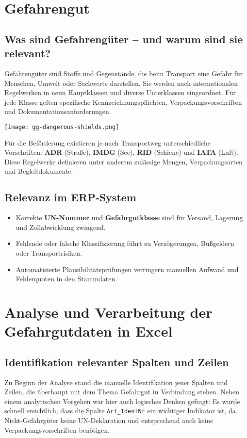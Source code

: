 \section{Gefahrengut}
\subsection{Was sind Gefahrengüter – und warum sind sie relevant?}

Gefahrengüter sind Stoffe und Gegenstände, die beim Transport eine
Gefahr für Menschen, Umwelt oder Sachwerte darstellen. Sie werden nach
internationalen Regelwerken in neun Hauptklassen und diverse Unterklassen
eingeordnet. Für jede Klasse gelten spezifische Kennzeichnungspflichten,
Verpackungsvorschriften und Dokumentationsanforderungen.

\begin{center}
  \texttt{[image: gg-dangerous-shields.png]}
\end{center}

Für die Beförderung existieren je nach Transportweg unterschiedliche Vorschriften:
\textbf{ADR} (Straße), \textbf{IMDG} (See), \textbf{RID} (Schiene) und \textbf{IATA} (Luft).
Diese Regelwerke definieren unter anderem zulässige Mengen, Verpackungsarten und
Begleitdokumente.

\subsection{Relevanz im ERP‐System}
\begin{itemize}
  \item Korrekte \textbf{UN-Nummer} und \textbf{Gefahrgutklasse} sind für
        Versand, Lagerung und Zollabwicklung zwingend.
  \item Fehlende oder falsche Klassifizierung führt zu
        Verzögerungen, Bußgeldern oder Transportrisiken.
  \item Automatisierte Plausibilitätsprüfungen verringern manuellen
        Aufwand und Fehlerquoten in den Stammdaten.
\end{itemize}


\section{Analyse und Verarbeitung der Gefahrgutdaten in Excel}

\subsection{Identifikation relevanter Spalten und Zeilen}
Zu Beginn der Analyse stand die manuelle Identifikation jener Spalten und Zeilen, die überhaupt mit dem 
Thema Gefahrgut in Verbindung stehen. Neben einem analytischen Vorgehen war hier auch logisches Denken gefragt: 
Es wurde schnell ersichtlich, dass die Spalte \texttt{Art\_IdentNr} ein wichtiger Indikator ist, 
da Nicht-Gefahrgüter keine UN-Deklaration und entsprechend auch keine Verpackungsvorschriften benötigen.

